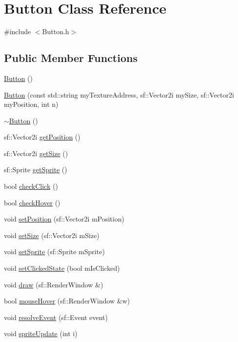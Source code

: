 \hypertarget{class_button}{\section{Button Class Reference}
\label{class_button}
}


{\ttfamily \#include $<$Button.\+h$>$}

\subsection*{Public Member Functions}
\begin{DoxyCompactItemize}
\item 
\hyperlink{class_button_a3b36df1ae23c58aedb9e15a713159459}{Button} ()
\item 
\hyperlink{class_button_a87776422759e035e83ac4fc5b2496df5}{Button} (const std\+::string my\+Texture\+Address, sf\+::\+Vector2i my\+Size, sf\+::\+Vector2i my\+Position, int n)
\item 
\hyperlink{class_button_a2a001eb9c3cc8ae54768a850dd345002}{$\sim$\+Button} ()
\item 
sf\+::\+Vector2i \hyperlink{class_button_a2e443c32638e77a836418ee331f2150b}{get\+Position} ()
\item 
sf\+::\+Vector2i \hyperlink{class_button_a91ffd0ee334d212183dd6a95ecb20419}{get\+Size} ()
\item 
sf\+::\+Sprite \hyperlink{class_button_a9d9b8af0b3053dd07eef9c3832e5a23c}{get\+Sprite} ()
\item 
bool \hyperlink{class_button_a52948ae70f6716f8dd7480122166d09e}{check\+Click} ()
\item 
bool \hyperlink{class_button_a5a81c2b30a885e90782def5c35bda9c5}{check\+Hover} ()
\item 
void \hyperlink{class_button_a9a14b9e9d3a3a94b7f00fe39ba8da37d}{set\+Position} (sf\+::\+Vector2i m\+Position)
\item 
void \hyperlink{class_button_a31a73bc77b109f0088b77f85c976fca6}{set\+Size} (sf\+::\+Vector2i m\+Size)
\item 
void \hyperlink{class_button_ad3c6790926d5a1c22ee137ab9b1cf78a}{set\+Sprite} (sf\+::\+Sprite m\+Sprite)
\item 
void \hyperlink{class_button_a7bce81f861e5c4f19b80a2143e5aa903}{set\+Clicked\+State} (bool m\+Is\+Clicked)
\item 
void \hyperlink{class_button_aa6a354cba909e3a02d9435fa0201cf73}{draw} (sf\+::\+Render\+Window \&)
\item 
bool \hyperlink{class_button_a33a1181bac39f9c17c8adef1d30ce5a8}{mouse\+Hover} (sf\+::\+Render\+Window \&w)
\item 
void \hyperlink{class_button_a671bf3270f24d032563a88f3e5904ccb}{resolve\+Event} (sf\+::\+Event event)
\item 
void \hyperlink{class_button_ae53496b03e9e231b4d80dc9f2ad84e4b}{sprite\+Update} (int i)
\end{DoxyCompactItemize}


